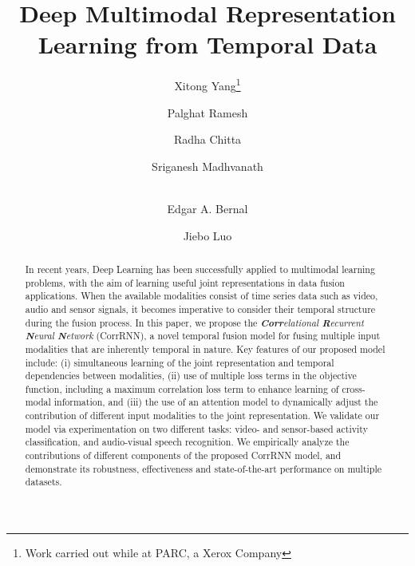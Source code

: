 \documentclass[10pt,twocolumn,letterpaper]{article}
\begin{document}
\title{Deep Multimodal Representation Learning from Temporal Data}


\makeatletter
\renewcommand\AB@affilsepx{ \space\space\space \protect\Affilfont}
\author[1]{Xitong Yang\thanks{Work carried out while at PARC, a Xerox Company}}
\author[2]{Palghat Ramesh}
\author[3]{Radha Chitta\protect\footnotemark[1]}
\author[3]{Sriganesh Madhvanath\protect\footnotemark[1]}
\author[4]{\protect\\ Edgar A. Bernal\protect\footnotemark[1]}
\author[5]{Jiebo Luo}

 \renewcommand\AB@affilsepx{, \protect\Affilfont}

\renewcommand\Authands{ and }


\maketitle
\begin{abstract}
In recent years, Deep Learning has been successfully applied to multimodal learning problems, with the aim of learning useful joint representations in data fusion applications. When the available modalities consist of time series data such as video, audio and sensor signals, it becomes imperative to consider their temporal structure during the fusion process. In this paper, we propose the \textit{\textbf{Corr}elational \textbf{R}ecurrent \textbf{N}eural \textbf{N}etwork} (CorrRNN), a novel temporal fusion model for fusing multiple input modalities that are inherently temporal in nature. Key features of our proposed model include: (i) simultaneous learning of the joint representation and temporal dependencies between modalities, (ii) use of multiple loss terms in the objective function, including a maximum correlation loss term to enhance learning of cross-modal information, and (iii) the use of an attention model to dynamically adjust the contribution of different input modalities to the joint representation. We validate our model via experimentation on two different tasks: video- and sensor-based activity classification, and audio-visual speech recognition. We empirically analyze the contributions of different components of the proposed CorrRNN model, and demonstrate its robustness, effectiveness and state-of-the-art performance on multiple datasets.
\end{abstract}
\end{document}
